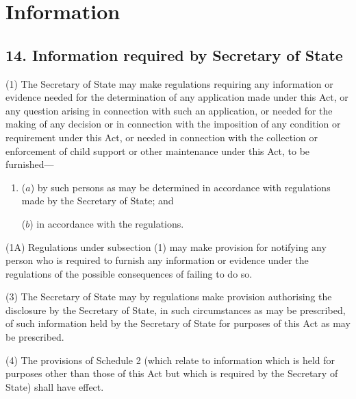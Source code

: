 \documentclass[a4paper]{article}
\begin{document}
\section{Information}

\subsection{14. Information required by Secretary of State}

(1) The Secretary of State may make regulations requiring any information or
evidence needed for the determination of any application made under this Act,
or any question arising in connection with such an application, or needed for
the making of any decision or in connection with the imposition of any condition or
requirement under this Act, or needed in connection with the collection or
enforcement of child support or other maintenance under this Act, to be furnished---
\begin{enumerate}\item[]
($a$)
by such persons as may be determined in accordance with regulations
made by the Secretary of State; and

($b$)
in accordance with the regulations.
\end{enumerate}

(1A)
Regulations under subsection (1) may make provision for notifying any
person who is required to furnish any information or evidence under the regulations of
the possible consequences of failing to do so.

(3)
The Secretary of State may by regulations make provision authorising the
disclosure by the Secretary of State, in such circumstances as may be prescribed,
of such information held by the Secretary of State for purposes of this Act as may be
prescribed.

(4)
The provisions of Schedule 2 (which relate to information which is held for
purposes other than those of this Act but which is required by the Secretary of State)
shall have effect. 

\end{document}
